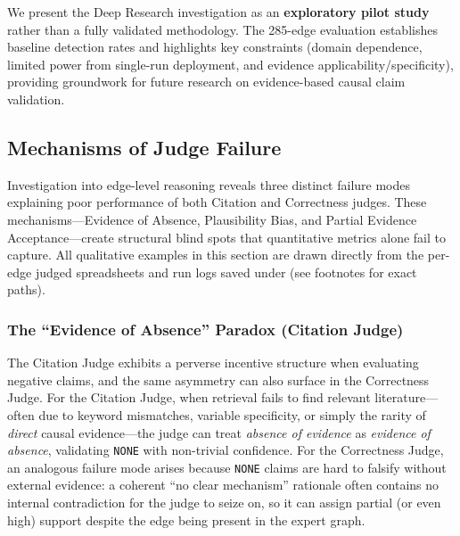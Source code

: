 We present the Deep Research investigation as an \textbf{exploratory pilot study} rather than a fully validated methodology. The 285-edge evaluation establishes baseline detection rates and highlights key constraints (domain dependence, limited power from single-run deployment, and evidence applicability/specificity), providing groundwork for future research on evidence-based causal claim validation.

\subsection{Mechanisms of Judge Failure}
\label{sec:discussion_failure_mechanisms}

Investigation into edge-level reasoning reveals three distinct failure modes explaining poor performance of both Citation and Correctness judges. These mechanisms---Evidence of Absence, Plausibility Bias, and Partial Evidence Acceptance---create structural blind spots that quantitative metrics alone fail to capture.
All qualitative examples in this section are drawn directly from the per-edge judged spreadsheets and run logs saved under \texttt{} (see footnotes for exact paths).

\subsubsection{The ``Evidence of Absence'' Paradox (Citation Judge)}

The Citation Judge exhibits a perverse incentive structure when evaluating negative claims, and the same asymmetry can also surface in the Correctness Judge. For the Citation Judge, when retrieval fails to find relevant literature---often due to keyword mismatches, variable specificity, or simply the rarity of \textit{direct} causal evidence---the judge can treat \textit{absence of evidence} as \textit{evidence of absence}, validating \texttt{NONE} with non-trivial confidence. For the Correctness Judge, an analogous failure mode arises because \texttt{NONE} claims are hard to falsify without external evidence: a coherent ``no clear mechanism'' rationale often contains no internal contradiction for the judge to seize on, so it can assign partial (or even high) support despite the edge being present in the expert graph.

